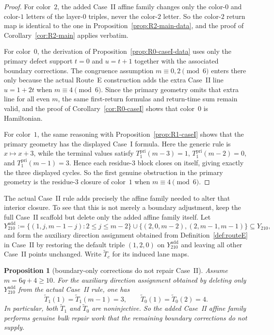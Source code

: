 \documentclass[11pt]{article}
\newtheorem{proposition}{Proposition}
\begin{document}
\begin{proof}
For color~$2$, the added Case~II affine family changes only the color-$0$ and color-$1$ letters of the layer-$0$ triples, never the color-$2$ letter.
So the color-$2$ return map is identical to the one in Proposition~\ref{prop:R2-main-data}, and the proof of Corollary~\ref{cor:R2-main} applies verbatim.

For color~$0$, the derivation of Proposition~\ref{prop:R0-caseI-data} uses only the primary defect support $t=0$ and $u=t+1$ together with the associated boundary corrections.
The congruence assumption $m\equiv 0,2\pmod 6$ enters there only because the actual Route~E construction adds the extra Case~II line $u=1+2t$ when $m\equiv 4\pmod 6$.
Since the primary geometry omits that extra line for all even $m$, the same first-return formulas and return-time sum remain valid, and the proof of Corollary~\ref{cor:R0-caseI} shows that color~$0$ is Hamiltonian.

For color~$1$, the same reasoning with Proposition~\ref{prop:R1-caseI} shows that the primary geometry has the displayed Case~I formula.
Here the generic rule is $x\mapsto x+3$, while the terminal values satisfy $T_1^{\mathrm{pri}}(m-3)=1$, $T_1^{\mathrm{pri}}(m-2)=0$, and $T_1^{\mathrm{pri}}(m-1)=3$.
Hence each residue-$3$ block closes on itself, giving exactly the three displayed cycles.
So the first genuine obstruction in the primary geometry is the residue-$3$ closure of color~$1$ when $m\equiv 4\pmod 6$.
\end{proof}

The actual Case~II rule adds precisely the affine family needed to alter that interior closure.
To see that this is not merely a boundary adjustment, keep the full Case~II scaffold but delete only the added affine family itself.
Let
\[
Y_{210}^{\mathrm{add}}
:=
\{(1,j,m-1-j):2\le j\le m-2\}\cup\{(2,0,m-2),(2,m-1,m-1)\}
\subseteq Y_{210},
\]
and form the auxiliary direction assignment obtained from Definition~\ref{def:routeE} in Case~II by restoring the default triple $(1,2,0)$ on $Y_{210}^{\mathrm{add}}$ and leaving all other Case~II points unchanged.
Write $\widetilde T_c$ for its induced lane maps.

\begin{proposition}[boundary-only corrections do not repair Case~II]\label{prop:boundary-no-go}
Assume $m=6q+4\ge 10$.
For the auxiliary direction assignment obtained by deleting only $Y_{210}^{\mathrm{add}}$ from the actual Case~II rule, one has
\[
\widetilde T_1(1)=\widetilde T_1(m-1)=3,
\qquad
\widetilde T_0(1)=\widetilde T_0(2)=4.
\]
In particular, both $\widetilde T_1$ and $\widetilde T_0$ are noninjective.
So the added Case~II affine family performs genuine bulk repair work that the remaining boundary corrections do not supply.
\end{proposition}
\end{document}
